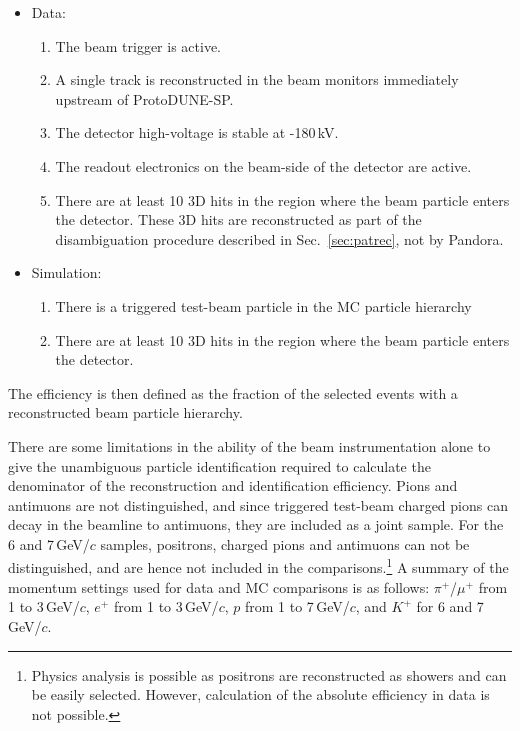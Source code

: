 \documentclass[epjc3]{svjour3}
\begin{document}
\begin{itemize}
\item[]Data:
\begin{enumerate}
  \item The beam trigger is active.
  \item A single track is reconstructed in the beam monitors immediately upstream of ProtoDUNE-SP.
  \item The detector high-voltage is stable at -180\,kV.
  \item The readout electronics on the beam-side of the detector are active.
  \item There are at least 10 3D hits in the region where the beam particle enters the detector. These 3D hits are reconstructed as part of the disambiguation procedure described in Sec.~\ref{sec:patrec}, not by Pandora.
\end{enumerate}
\item[] Simulation:
\begin{enumerate}
  \item There is a triggered test-beam particle in the MC particle hierarchy
  \item There are at least 10 3D hits in the region where the beam particle enters the detector.
\end{enumerate}
\end{itemize}
The efficiency is then defined as the fraction of the selected events with a reconstructed beam particle hierarchy. 

There are some limitations in the ability of the beam instrumentation alone to give the unambiguous particle identification required to calculate the denominator of the reconstruction and identification efficiency. Pions and antimuons are not distinguished, and since triggered test-beam charged pions can decay in the beamline to antimuons, they are included as a joint sample. For the 6 and 7\,GeV/$c$ samples, positrons, charged pions and antimuons can not be distinguished, and are hence not included in the comparisons.\footnote{Physics analysis is possible as positrons are reconstructed as showers and can be easily selected. However, calculation of the absolute efficiency in data is not possible.} A summary of the momentum settings used for data and MC comparisons is as follows:
$\pi^{+}$/$\mu^+$ from 1 to 3\,GeV/$c$, $e^+$ from 1 to 3\,GeV/$c$, $p$ from 1 to 7\,GeV/$c$, and $K^+$ for 6 and 7\,GeV/$c$.
\end{document}

